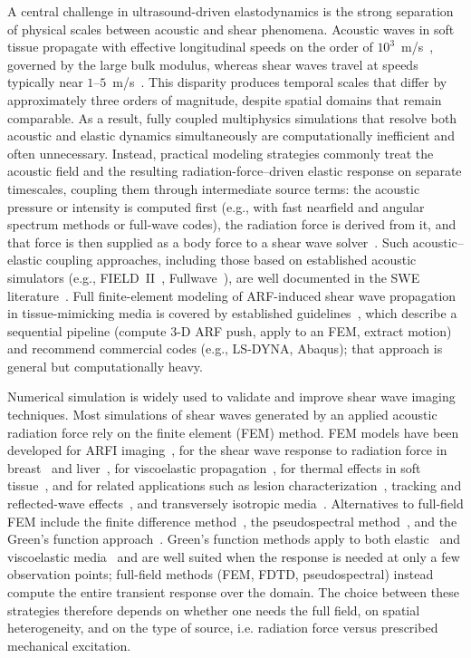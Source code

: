\documentclass[11pt]{article}
\begin{document}
A central challenge in ultrasound-driven elastodynamics is the strong
separation of physical scales between acoustic and shear phenomena. Acoustic
waves in soft tissue propagate with effective longitudinal speeds on the order
of $10^3$~m/s~\cite{szabo2014diagnostic,duck1990physical}, governed by the large bulk modulus, whereas shear waves travel
at speeds typically near $1$--$5$~m/s~\cite{sandrin2003transient,tanter2008quantitative}. This disparity produces temporal scales
that differ by approximately three orders of magnitude, despite spatial domains
that remain comparable. As a result, fully coupled multiphysics simulations that
resolve both acoustic and elastic dynamics simultaneously are computationally
inefficient and often unnecessary. Instead, practical modeling strategies
commonly treat the acoustic field and the resulting radiation-force–driven
elastic response on separate timescales, coupling them through intermediate
source terms: the acoustic pressure or intensity is computed first (e.g., with
fast nearfield and angular spectrum methods or full-wave codes), the radiation
force is derived from it, and that force is then supplied as a body force to a
shear wave solver~\cite{yang2018gpu}. Such acoustic–elastic coupling approaches, including those based
on established acoustic simulators (e.g., FIELD~II~\cite{jensen1996field}, Fullwave~\cite{pinton2020fullwave}), are
well documented in the SWE literature~\cite{bercoff2004supersonic,barr2015elastography}.
Full finite-element modeling of
ARF-induced shear wave propagation in tissue-mimicking media is covered by
established guidelines~\cite{palmeri2017fem}, which describe a sequential pipeline
(compute 3-D ARF push, apply to an FEM, extract motion) and recommend commercial
codes (e.g., LS-DYNA, Abaqus); that approach is general but computationally
heavy.

Numerical simulation is widely used to validate and improve shear wave
imaging techniques. Most simulations of shear waves generated by an applied
acoustic radiation force rely on the finite element (FEM) method. FEM models
have been developed for ARFI imaging~\cite{palmeri2005fem}, for the shear
wave response to radiation force in breast~\cite{nightingale2000fem} and
liver~\cite{palmeri2008liver}, for viscoelastic
propagation~\cite{lee2012viscoelastic}, for thermal effects in soft
tissue~\cite{palmeri2004thermal}, and for related applications such as lesion
characterization~\cite{fahey2005}, tracking and reflected-wave
effects~\cite{palmeri2006}, and transversely isotropic
media~\cite{rouze2013}. Alternatives to full-field FEM include the finite
difference method~\cite{orescanin2011fdtd,langdon2015}, the pseudospectral
method~\cite{qiang2015}, and the Green's function
approach~\cite{gennisson2003,bercoff2004supersonic,calle2005,chatelin2016}.
Green's function methods apply to both elastic~\cite{calle2005} and
viscoelastic media~\cite{bercoff2004supersonic} and are well suited when the
response is needed at only a few observation points; full-field methods (FEM,
FDTD, pseudospectral) instead compute the entire transient response over the
domain. The choice between these strategies therefore depends on whether one
needs the full field, on spatial heterogeneity, and on the type of source, i.e.
radiation force versus prescribed mechanical excitation.
\end{document}
